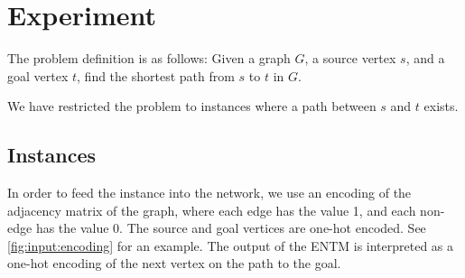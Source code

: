 
\section{Experiment}
The problem definition is as follows: 
Given a graph $G$, a source vertex $s$, and a goal vertex $t$, find the shortest path from $s$ to $t$ in $G$.

\newpar We have restricted the problem to instances where a path between $s$ and $t$ exists.

\subsection{Instances}
In order to feed the instance into the network, we use an encoding of the adjacency matrix of the graph, where each edge has the value 1, and each non-edge has the value 0. The source and goal vertices are one-hot encoded. See \autoref{fig:input:encoding} for an example. The output of the ENTM is interpreted as a one-hot encoding of the next vertex on the path to the goal.

